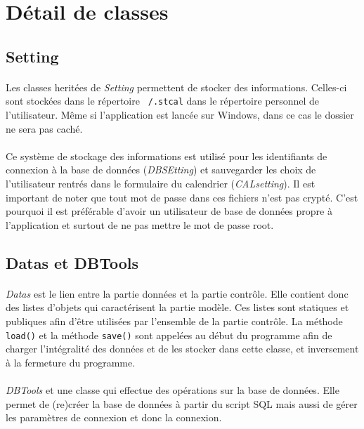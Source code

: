 \documentclass[a4paper,10pt]{report}
\begin{document}
	\section{Détail de classes}

		\subsection{Setting}

			\paragraph*{}
			Les classes heritées de \textit{Setting} permettent de stocker des informations. Celles-ci sont stockées dans le répertoire \texttt{~/.stcal} dans le répertoire personnel de l'utilisateur. Même si l'application est lancée sur Windows, dans ce cas le dossier ne sera pas caché.
			
			\paragraph*{}
			Ce système de stockage des informations est utilisé pour les identifiants de connexion à la base de données (\textit{DBSEtting}) et sauvegarder les choix de l’utilisateur rentrés dans le formulaire du calendrier (\textit{CALsetting}). Il est important de noter que tout mot de passe dans ces fichiers n'est pas crypté. C'est pourquoi il est préférable d'avoir un utilisateur de base de données propre à l'application et surtout de ne pas mettre le mot de passe root.

		\subsection{Datas et DBTools}

			\paragraph*{}
			\textit{Datas} est le lien entre la partie données et la partie contrôle. Elle contient donc des listes d’objets qui caractérisent la partie modèle. Ces listes sont statiques et publiques afin d’être utilisées par l’ensemble de la partie contrôle.
			La méthode \texttt{load()} et la méthode \texttt{save()} sont appelées au début du programme afin de charger l'intégralité des données et de les stocker dans cette classe, et inversement à la fermeture du programme.

			\paragraph*{}
			\textit{DBTools} et une classe qui effectue des opérations sur la base de données. Elle permet de (re)créer la base de données à partir du script SQL mais aussi de gérer les paramètres de connexion et donc la connexion.
\end{document}
